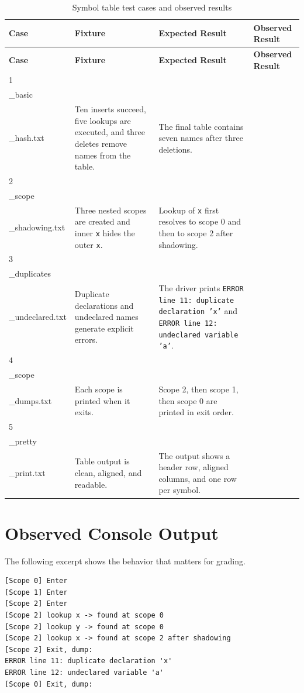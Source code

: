 \documentclass[11pt]{article}
\begin{document}
\begin{longtable}{|p{}|p{}|p{}|p{}|}
\caption{Symbol table test cases and observed results}\label{tab:tests}\\
\hline
\textbf{Case} & \textbf{Fixture} & \textbf{Expected Result} & \textbf{Observed Result} \\
\hline
\endfirsthead
\hline
\textbf{Case} & \textbf{Fixture} & \textbf{Expected Result} & \textbf{Observed Result} \\
\hline
\endhead
1 & \texttt{case01\\_basic\\_hash.txt} & Ten inserts succeed, five lookups are executed, and three deletes remove names from the table. & The final table contains seven names after three deletions. \\
\hline
2 & \texttt{case02\\_scope\\_shadowing.txt} & Three nested scopes are created and inner \texttt{x} hides the outer \texttt{x}. & Lookup of \texttt{x} first resolves to scope 0 and then to scope 2 after shadowing. \\
\hline
3 & \texttt{case03\\_duplicates\\_undeclared.txt} & Duplicate declarations and undeclared names generate explicit errors. & The driver prints \texttt{ERROR line 11: duplicate declaration 'x'} and \texttt{ERROR line 12: undeclared variable 'a'}. \\
\hline
4 & \texttt{case04\\_scope\\_dumps.txt} & Each scope is printed when it exits. & Scope 2, then scope 1, then scope 0 are printed in exit order. \\
\hline
5 & \texttt{case05\\_pretty\\_print.txt} & Table output is clean, aligned, and readable. & The output shows a header row, aligned columns, and one row per symbol. \\
\hline
\end{longtable}

\section{Observed Console Output}
The following excerpt shows the behavior that matters for grading.

\begin{verbatim}
[Scope 0] Enter
[Scope 1] Enter
[Scope 2] Enter
[Scope 2] lookup x -> found at scope 0
[Scope 2] lookup y -> found at scope 0
[Scope 2] lookup x -> found at scope 2 after shadowing
[Scope 2] Exit, dump:
ERROR line 11: duplicate declaration 'x'
ERROR line 12: undeclared variable 'a'
[Scope 0] Exit, dump:
\end{verbatim}
\end{document}
